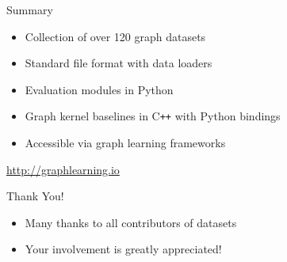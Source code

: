 \documentclass[utf8, xcolor=dvipsnames,ngerman]{beamer}
\begin{document}
\begin{frame}{Summary}

\begin{itemize}
 \item Collection of over 120 graph datasets 
 \item Standard file format with data loaders
 \item Evaluation modules in Python
 \item Graph kernel baselines in C\texttt{++} with Python bindings
 \item Accessible via graph learning frameworks
\end{itemize}

\vspace{1.5em}

\pause

\begin{center}
 \Large{ \url{http://graphlearning.io}}
\end{center}


\vspace{1.5em}

\pause
\begin{block}{Thank You!}
\begin{itemize}
 \item Many thanks to all contributors of datasets
 \item Your involvement is greatly appreciated!
\end{itemize}

\end{block}
\end{frame}
\end{document}
